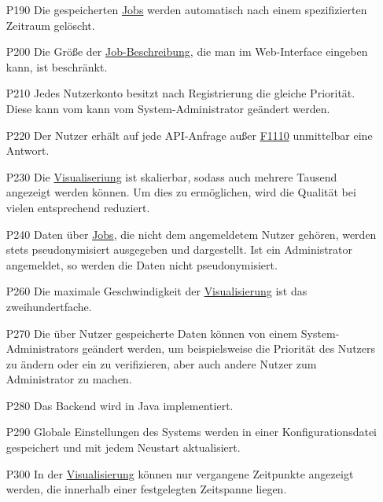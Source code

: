\begin{itemize}[noitemsep]
    \item[P190] Die gespeicherten \hyperref[B:Jobs]{Jobs} werden automatisch nach einem spezifizierten Zeitraum gelöscht.

    \item[P200] Die Größe der \hyperref[B:Job-Beschreibung]{Job-Beschreibung}, die man im \gls{Web-Interface} eingeben kann, ist beschränkt.

    
    \item[P210] Jedes \gls{Nutzerkonto} besitzt nach Registrierung die gleiche Priorität. Diese kann vom kann vom \gls{System-Administrator} geändert werden.
    
    
    \item[P220] Der \gls{Nutzer} erhält auf jede \gls{API}-Anfrage außer \hyperref[FA:API:Andauernde Abfrage des Ergebnisses eines Jobs]{F1110} unmittelbar eine  Antwort.
    
    \item[P230] Die \hyperref[pages:visualization]{Visualiseriung} ist skalierbar, sodass auch mehrere Tausend  angezeigt werden können. Um dies zu ermöglichen, wird die Qualität bei vielen  entsprechend reduziert.%
    
    \item[P240] Daten über \hyperref[B:Jobs]{Jobs}, die nicht dem angemeldetem \gls{Nutzer} gehören, werden stets pseudonymisiert ausgegeben und dargestellt. Ist ein \gls{Administrator} angemeldet, so werden die Daten nicht pseudonymisiert.
    
    
    \item[P260] Die maximale Geschwindigkeit der \hyperref[pages:visualization]{Visualisierung} ist das zweihundertfache.
    
    \item[P270] Die über \gls{Nutzer} gespeicherte Daten können von einem \glspl{System-Administrator} geändert werden, um beispielsweise die Priorität des \gls{Nutzer}s zu ändern oder ein  zu verifizieren, aber auch andere \gls{Nutzer} zum \gls{Administrator} zu machen.
    
    \item[P280] Das Backend wird in Java implementiert.

    \item[P290] Globale Einstellungen des Systems werden in einer \gls{Konfigurationsdatei} gespeichert und mit jedem Neustart aktualisiert.
    
    \item[P300] In der \hyperref[pages:visualization]{Visualisierung} können nur vergangene Zeitpunkte angezeigt werden, die innerhalb einer festgelegten Zeitspanne liegen.
\end{itemize}
